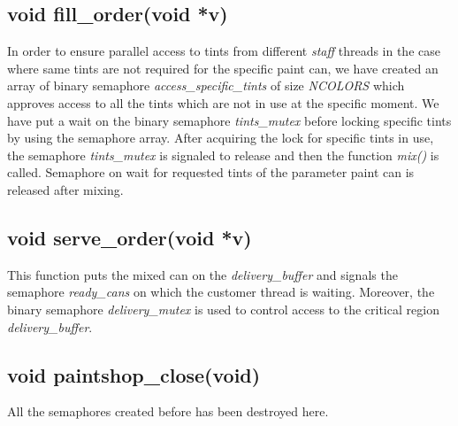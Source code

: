 \documentclass[a4paper]{article}
\begin{document}
\subsection{void fill\_order(void *v)}
In order to ensure parallel access to tints from different \textit{staff} threads in the case where same tints are not required for the specific paint can, we have created an array of binary semaphore \textit{access\_specific\_tints} of size \textit{NCOLORS} which approves access to all the tints which are not in use at the specific moment. We have put a wait on the binary semaphore \textit{tints\_mutex} before locking specific tints by using the semaphore array. After acquiring the lock for specific tints in use, the semaphore \textit{tints\_mutex} is signaled to release and then the function \textit{mix()} is called. Semaphore on wait for requested tints of the parameter paint can is released after mixing.

\subsection{void serve\_order(void *v)}
This function puts the mixed can on the \textit{delivery\_buffer} and signals the semaphore \textit{ready\_cans} on which the customer thread is waiting. Moreover, the binary semaphore \textit{delivery\_mutex} is used to control access to the critical region \textit{delivery\_buffer}. 

\subsection{void paintshop\_close(void)}
All the semaphores created before has been destroyed here.
\end{document}
